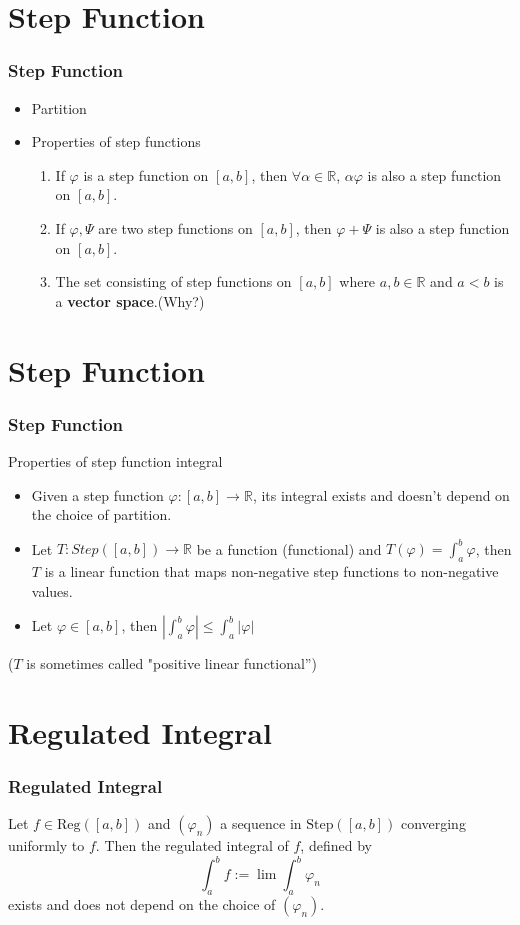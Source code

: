 \documentclass[12pt, t]{beamer}
\begin{document}
\section{Step Function}
\begin{frame}
    \frametitle{Step Function}
    \begin{itemize}
        \item Partition
        \item Properties of step functions
              \begin{enumerate}
                  \item If $\varphi$ is a step function on $[a,b]$, then $\forall\alpha\in\mathbb{R}$, $\alpha\varphi$ is also a step function on $[a,b]$.
                  \item If $\varphi,\Psi$ are two step functions on $[a,b]$, then $\varphi+\Psi$ is also a step function on $[a,b]$.
                  \item The set consisting of step functions on $[a,b]$ where $a,b\in\mathbb{R}$ and $a<b$ is a \textbf{vector space}.(Why?)
              \end{enumerate}
    \end{itemize}


\end{frame}

\section{Step Function}
\begin{frame}
    \frametitle{Step Function}
    Properties of step function integral
    \begin{itemize}
        \item Given a step function $\varphi:[a,b]\rightarrow\mathbb{R}$, its integral exists and doesn't depend on the choice of partition.
        \item Let $T:Step([a,b])\rightarrow\mathbb{R}$ be a function (functional) and $T(\varphi)=\int_{a}^{b}\varphi$, then $T$ is a linear function that maps non-negative step functions to non-negative values.
        \item Let $\varphi\in[a,b]$, then $|\int^{b}_{a}\varphi|\leq\int^{b}_{a}|\varphi|$
    \end{itemize}
    \mbox{}
    \vfill
    \footnotesize($T$ is sometimes called "positive linear functional'')
\end{frame}

\section{Regulated Integral}
\begin{frame}
    \frametitle{Regulated Integral}
    \hspace{2em} Let $f\in\text{Reg}([a,b])$ and $(\varphi_n)$ a sequence in $\text{Step}([a,b])$ converging uniformly to $f$. Then the regulated integral of $f$, defined by
    \begin{equation*}
        \int_a^bf:=\lim\int_a^b\varphi_n
    \end{equation*}
    exists and does not depend on the choice of $(\varphi_n)$.
\end{frame}
\end{document}
